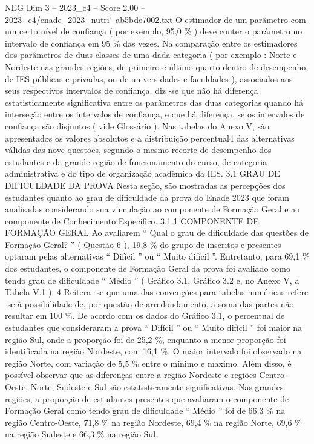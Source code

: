\begin{textsample}{NEG Dim 3 – 2023\_c4 – Score 2.00 – 2023\_c4/enade\_2023\_nutri\_ab5bde7002.txt}
O estimador de um parâmetro com um certo nível de confiança ( por exemplo, 95,0 \% ) deve conter o parâmetro no intervalo de confiança em 95 \% das vezes.
Na comparação entre os estimadores dos parâmetros de duas classes de uma dada categoria ( por exemplo : Norte e Nordeste nas grandes regiões, de primeiro e último quarto dentro de desempenho, de IES públicas e privadas, ou de universidades e faculdades ), associados aos seus respectivos intervalos de confiança, diz -se que não há diferença estatisticamente significativa entre os parâmetros das duas categorias quando há interseção entre os intervalos de confiança, e que há diferença, se os intervalos de confiança são disjuntos ( vide Glossário ).
Nas tabelas do Anexo V, são apresentados os valores absolutos e a distribuição percentual4 das alternativas válidas das nove questões, segundo o mesmo recorte de desempenho dos estudantes e da grande região de funcionamento do curso, de categoria administrativa e do tipo de organização acadêmica da IES. 3.1 GRAU DE DIFICULDADE DA PROVA Nesta seção, são mostradas as percepções dos estudantes quanto ao grau de dificuldade da prova do Enade 2023 que foram analisadas considerando sua vinculação ao componente de Formação Geral e ao componente de Conhecimento Específico. 3.1.1 COMPONENTE DE FORMAÇÃO GERAL Ao avaliarem “ Qual o grau de dificuldade das questões de Formação Geral? ” ( Questão 6 ), 19,8 \% do grupo de inscritos e presentes optaram pelas alternativas “ Difícil ” ou “ Muito difícil ”.
Entretanto, para 69,1 \% dos estudantes, o componente de Formação Geral da prova foi avaliado como tendo grau de dificuldade “ Médio ” ( Gráfico 3.1, Gráfico 3.2 e, no Anexo V, a Tabela V.1 ). 4 Reitera -se que uma das convenções para tabelas numéricas refere -se à possibilidade de, por questão de arredondamento, a soma das partes não resultar em 100 \%.
De acordo com os dados do Gráfico 3.1, o percentual de estudantes que consideraram a prova “ Difícil ” ou “ Muito difícil ” foi maior na região Sul, onde a proporção foi de 25,2 \%, enquanto a menor proporção foi identificada na região Nordeste, com 16,1 \%.
O maior intervalo foi observado na região Norte, com variação de 5,5 \% entre o mínimo e máximo.
Além disso, é possível observar que as diferenças entre a região Nordeste e regiões Centro-Oeste, Norte, Sudeste e Sul são estatisticamente significativas.
Nas grandes regiões, a proporção de estudantes presentes que avaliaram o componente de Formação Geral como tendo grau de dificuldade “ Médio ” foi de 66,3 \% na região Centro-Oeste, 71,8 \% na região Nordeste, 69,4 \% na região Norte, 69,6 \% na região Sudeste e 66,3 \% na região Sul.

\end{textsample}
